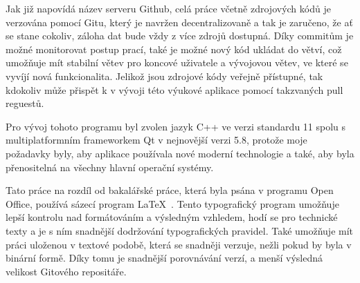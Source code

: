 Jak již napovídá název serveru Github, celá práce včetně zdrojových kódů je verzována pomocí Gitu, který je navržen decentralizovaně a tak je zaručeno, že ať se stane cokoliv, záloha dat bude vždy z více zdrojů dostupná. Díky commitům je možné monitorovat postup prací, také je možné nový kód ukládat do větví, což umožňuje mít stabilní větev pro koncové uživatele a vývojovou větev, ve které se vyvíjí nová funkcionalita. Jelikož jsou zdrojové kódy veřejně přístupné, tak kdokoliv může přispět k v vývoji této výukové aplikace pomocí takzvaných pull reguestů.

Pro vývoj tohoto programu byl zvolen jazyk C++ ve verzi standardu 11 spolu s multiplatformním frameworkem Qt v nejnovější verzi 5.8, protože moje požadavky byly, aby aplikace používala nové moderní technologie a také, aby byla přenositelná na všechny hlavní operační systémy.

Tato práce na rozdíl od bakalářské práce, která byla psána v programu Open Office, používá sázecí program \LaTeX\ \cite{latex}. Tento typografický program umožňuje lepší kontrolu nad formátováním a výsledným vzhledem, hodí se pro technické texty a je s ním snadnější dodržování typografických pravidel. Také umožňuje mít práci uloženou v textové podobě, která se snadněji verzuje, nežli pokud by byla v binární formě. Díky tomu je snadnější porovnávání verzí, a menší výsledná velikost Gitového repositáře.





